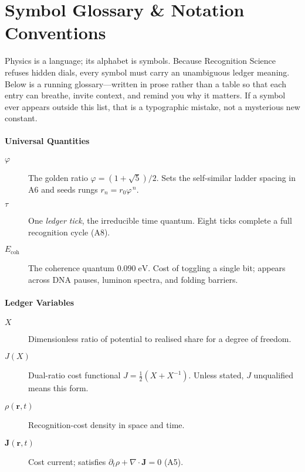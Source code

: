 \documentclass[11pt,oneside]{book}
\begin{document}
\chapter{Symbol Glossary \& Notation Conventions}
\label{sec:symbols-notation}

Physics is a language; its alphabet is symbols.  
Because Recognition Science refuses hidden dials, every symbol must carry
an unambiguous ledger meaning.  
Below is a running glossary—written in prose rather than a table so that
each entry can breathe, invite context, and remind you why it matters.
If a symbol ever appears outside this list, that is a typographic
mistake, not a mysterious new constant.

\bigskip
\subsubsection*{Universal Quantities}
\begin{description}
\item[$\varphi$] The golden ratio \(\varphi=(1+\sqrt5)/2\).  
  Sets the self-similar ladder spacing in A6 and seeds rungs
  \(r_n=r_0\varphi^{\,n}\).
\item[$\tau$] One \emph{ledger tick}, the irreducible time quantum.  
  Eight ticks complete a full recognition cycle (A8).
\item[$E_{\text{coh}}$] The coherence quantum \(0.090\;\text{eV}\).  
  Cost of toggling a single bit; appears across DNA pauses, luminon
  spectra, and folding barriers.
\end{description}

\subsubsection*{Ledger Variables}
\begin{description}
\item[$X$] Dimensionless ratio of potential to realised share for a
  degree of freedom.  
\item[$J(X)$] Dual-ratio cost functional
  \(J=\tfrac12(X+X^{-1})\).  
  Unless stated, $J$ unqualified means this form.
\item[$\rho(\mathbf r,t)$] Recognition-cost density in space and time.  
\item[$\mathbf J(\mathbf r,t)$] Cost current; satisfies
  \(\partial_t\rho+\nabla\!\cdot\!\mathbf J=0\) (A5).
\end{description}
\end{document}
